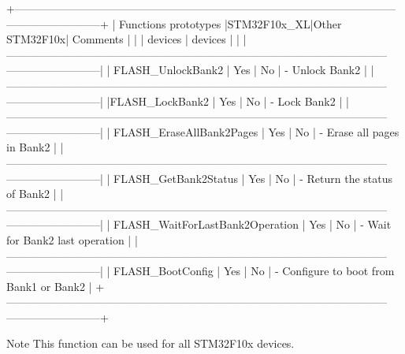 \begin{DoxyCode}
  +--------------------------------------------------------------------------------------------------------
      --------------------------+
  |       Functions prototypes         |STM32F10x\_XL|Other STM32F10x|    Comments                          
                                |
  |                                    |   devices  |  devices      |                                      
                                |
  |--------------------------------------------------------------------------------------------------------
      --------------------------|
  | FLASH\_UnlockBank2                  |    Yes     |      No       | - Unlock Bank2                       
                                |
  |--------------------------------------------------------------------------------------------------------
      --------------------------|
  |FLASH\_LockBank2                     |    Yes     |      No       | - Lock Bank2                         
                                |
  |--------------------------------------------------------------------------------------------------------
      --------------------------|
  | FLASH\_EraseAllBank2Pages           |    Yes     |      No       | - Erase all pages in Bank2           
                                |
  |--------------------------------------------------------------------------------------------------------
      --------------------------|
  | FLASH\_GetBank2Status               |    Yes     |      No       | - Return the status of Bank2         
                                |
  |--------------------------------------------------------------------------------------------------------
      --------------------------|
  | FLASH\_WaitForLastBank2Operation    |    Yes     |      No       | - Wait \textcolor{keywordflow}{for} Bank2 last operation      
                                |
  |--------------------------------------------------------------------------------------------------------
      --------------------------|
  | FLASH\_BootConfig                   |    Yes     |      No       | - Configure to boot from Bank1 or 
      Bank2                        |
  +--------------------------------------------------------------------------------------------------------
      --------------------------+
\end{DoxyCode}
 \begin{DoxyNote}{Note}
This function can be used for all S\+T\+M32\+F10x devices. 
\end{DoxyNote}

